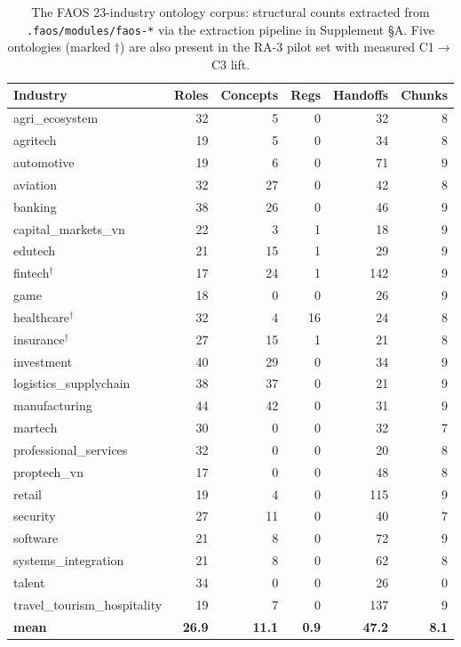 \documentclass[11pt,a4paper]{article}
\newcommand{\faos}{\textsc{FAOS}}
\begin{document}
\begin{table}[t]
\centering
\caption{The \faos{} 23-industry ontology corpus: structural counts
extracted from \texttt{.faos/modules/faos-*} via the extraction
pipeline in Supplement \S A. Five ontologies (marked $\dagger$) are also
present in the RA-3 pilot set with measured C1$\to$C3 lift.}
\label{tab:corpus-overview}
\small
\begin{tabular}{@{}lrrrrr@{}}
\toprule
\textbf{Industry} & \textbf{Roles} & \textbf{Concepts} & \textbf{Regs} &
\textbf{Handoffs} & \textbf{Chunks} \\
\midrule
agri\_ecosystem              & 32 & 5  & 0  & 32  & 8 \\
agritech                     & 19 & 5  & 0  & 34  & 8 \\
automotive                   & 19 & 6  & 0  & 71  & 9 \\
aviation                     & 32 & 27 & 0  & 42  & 8 \\
banking                      & 38 & 26 & 0  & 46  & 9 \\
capital\_markets\_vn         & 22 & 3  & 1  & 18  & 9 \\
edutech                      & 21 & 15 & 1  & 29  & 9 \\
fintech$^\dagger$            & 17 & 24 & 1  & 142 & 9 \\
game                         & 18 & 0  & 0  & 26  & 9 \\
healthcare$^\dagger$         & 32 & 4  & 16 & 24  & 8 \\
insurance$^\dagger$          & 27 & 15 & 1  & 21  & 8 \\
investment                   & 40 & 29 & 0  & 34  & 9 \\
logistics\_supplychain       & 38 & 37 & 0  & 21  & 9 \\
manufacturing                & 44 & 42 & 0  & 31  & 9 \\
martech                      & 30 & 0  & 0  & 32  & 7 \\
professional\_services       & 32 & 0  & 0  & 20  & 8 \\
proptech\_vn                 & 17 & 0  & 0  & 48  & 8 \\
retail                       & 19 & 4  & 0  & 115 & 9 \\
security                     & 27 & 11 & 0  & 40  & 7 \\
software                     & 21 & 8  & 0  & 72  & 9 \\
systems\_integration         & 21 & 8  & 0  & 62  & 8 \\
talent                       & 34 & 0  & 0  & 26  & 0 \\
travel\_tourism\_hospitality & 19 & 7  & 0  & 137 & 9 \\
\midrule
\textbf{mean} & \textbf{26.9} & \textbf{11.1} & \textbf{0.9} & \textbf{47.2} & \textbf{8.1} \\
\bottomrule
\end{tabular}
\end{table}
\end{document}
